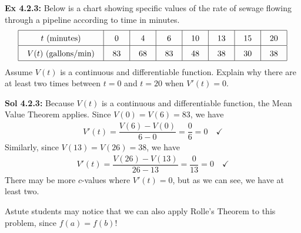 \begin{tcolorbox}[example]
    \textbf{Ex 4.2.3: } Below is a chart showing specific values of the rate of sewage flowing through a pipeline according to time in minutes. \begin{align*}
        \arraycolsep=11pt\def\arraystretch{1.5}
        \begin{array}{|c|c|c|c|c|c|c|c|}
            \hline
            t \text{ (minutes)} & 0 & 4 & 6 & 10 & 13 & 15 & 20 \\ \hline
            V(t) \text{ (gallons/min)} & 83 & 68 & 83 & 48 & 38 & 30 & 38 \\
            \hline 
        \end{array}
    \end{align*} 
    Assume $V(t)$ is a continuous and differentiable function. Explain why there are at least two times between $t = 0$ and $t = 20$ when $V'(t) = 0$.
\end{tcolorbox}
\begin{tcolorbox}[solution]
    \textbf{Sol 4.2.3: } Because $V(t)$ is a continuous and differentiable function, the Mean Value Theorem applies. Since $V(0) = V(6) = 83$, we have \begin{align*}
        V'(t) = \dfrac{V(6) - V(0)}{6 - 0} = \dfrac{0}{6} = 0 \quad \checkmark
    \end{align*}
    Similarly, since $V(13) = V(26) = 38$, we have \begin{align*}
        V'(t) = \dfrac{V(26) - V(13)}{26 - 13} = \dfrac{0}{13} = 0 \quad \checkmark
    \end{align*}
    There may be more $c$-values where $V'(t) = 0$, but as we can see, we have at least two. \par
    \begin{tcolorbox}[interesting]
        Astute students may notice that we can also apply Rolle's Theorem to this problem, since $f(a) = f(b)$!
    \end{tcolorbox}
\end{tcolorbox} \vspace{11pt}


